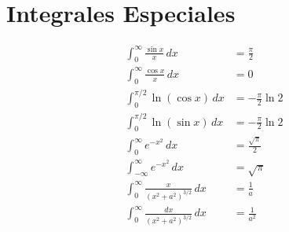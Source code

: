 \documentclass[11pt]{article}
\begin{document}
\section*{Integrales Especiales}

\begin{align}
    \int_0^{\infty} \frac{\sin x}{x} \, dx &= \frac{\pi}{2} \\[10pt]
    \int_0^{\infty} \frac{\cos x}{x} \, dx &= 0 \\[10pt]
    \int_0^{\pi/2} \ln (\cos x) \, dx &= -\frac{\pi}{2} \ln 2 \\[10pt]
    \int_0^{\pi/2} \ln (\sin x) \, dx &= -\frac{\pi}{2} \ln 2 \\[10pt]
    \int_0^{\infty} e^{-x^2} \, dx &= \frac{\sqrt{\pi}}{2} \\[10pt]
    \int_{-\infty}^{\infty} e^{-x^2} \, dx &= \sqrt{\pi} \\[10pt]
    \int_0^{\infty} \frac{x}{(x^2 + a^2)^{3/2}} \, dx &= \frac{1}{a} \\[10pt]
    \int_0^{\infty} \frac{dx}{(x^2 + a^2)^{3/2}} \, dx &= \frac{1}{a^2}
\end{align}
\end{document}
